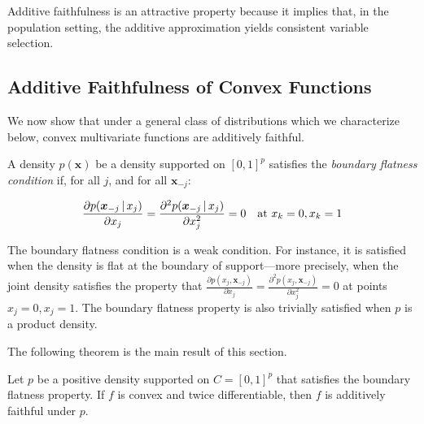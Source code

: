 
Additive faithfulness is an attractive property because it implies
that, in the population setting, the additive approximation yields
consistent variable selection.

\subsection{Additive Faithfulness of Convex Functions}

We now show that under a general class of distributions which we
characterize below, convex multivariate functions are additively
faithful.

\begin{definition}
\label{defn:boundary-point}
A density $p(\mathbf{x})$ be a density supported on $[0,1]^p$ satisfies
the \emph{boundary flatness condition} if, for all $j$, and for all $\mathbf{x}_{-j}$:

\begin{equation}
\frac{\partial p(\mbox{\boldmath $x$}_{-j} {\,|\,} x_j)}{\partial x_j}  =  
\frac{\partial^2 p(\mbox{\boldmath $x$}_{-j} {\,|\,} x_j)}{\partial x_j^2} = 0
\quad \textrm{at } x_k = 0, x_k = 1
\end{equation}

\end{definition}



The boundary flatness condition is a weak condition. For instance, it is
satisfied when the density is flat at the boundary of support---more
precisely, when the joint density satisfies the property that
$\frac{\partial p(x_j,\mathbf{x}_{-j})}{\partial x_j} =
\frac{\partial^2 p(x_j, \mathbf{x}_{-j})}{\partial x_j^2} = 0$ at
points $x_j = 0, x_j=1$. The boundary flatness property is also
trivially satisfied when $p$ is a product density.

The following theorem is the main result of this section.

\begin{theorem}
\label{thm:convex_faithful}
Let $p$ be a positive density supported on $C=[0,1]^p$ that satisfies
the boundary flatness property. 
If $f$ is convex and twice differentiable, then $f$ is additively faithful under $p$.
\end{theorem}


